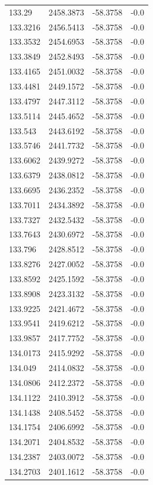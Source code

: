 \begin{table}[H]
\begin{tabular}{llll}
133.29 & 2458.3873 & -58.3758 & -0.0 \\
133.3216 & 2456.5413 & -58.3758 & -0.0 \\
133.3532 & 2454.6953 & -58.3758 & -0.0 \\
133.3849 & 2452.8493 & -58.3758 & -0.0 \\
133.4165 & 2451.0032 & -58.3758 & -0.0 \\
133.4481 & 2449.1572 & -58.3758 & -0.0 \\
133.4797 & 2447.3112 & -58.3758 & -0.0 \\
133.5114 & 2445.4652 & -58.3758 & -0.0 \\
133.543 & 2443.6192 & -58.3758 & -0.0 \\
133.5746 & 2441.7732 & -58.3758 & -0.0 \\
133.6062 & 2439.9272 & -58.3758 & -0.0 \\
133.6379 & 2438.0812 & -58.3758 & -0.0 \\
133.6695 & 2436.2352 & -58.3758 & -0.0 \\
133.7011 & 2434.3892 & -58.3758 & -0.0 \\
133.7327 & 2432.5432 & -58.3758 & -0.0 \\
133.7643 & 2430.6972 & -58.3758 & -0.0 \\
133.796 & 2428.8512 & -58.3758 & -0.0 \\
133.8276 & 2427.0052 & -58.3758 & -0.0 \\
133.8592 & 2425.1592 & -58.3758 & -0.0 \\
133.8908 & 2423.3132 & -58.3758 & -0.0 \\
133.9225 & 2421.4672 & -58.3758 & -0.0 \\
133.9541 & 2419.6212 & -58.3758 & -0.0 \\
133.9857 & 2417.7752 & -58.3758 & -0.0 \\
134.0173 & 2415.9292 & -58.3758 & -0.0 \\
134.049 & 2414.0832 & -58.3758 & -0.0 \\
134.0806 & 2412.2372 & -58.3758 & -0.0 \\
134.1122 & 2410.3912 & -58.3758 & -0.0 \\
134.1438 & 2408.5452 & -58.3758 & -0.0 \\
134.1754 & 2406.6992 & -58.3758 & -0.0 \\
134.2071 & 2404.8532 & -58.3758 & -0.0 \\
134.2387 & 2403.0072 & -58.3758 & -0.0 \\
134.2703 & 2401.1612 & -58.3758 & -0.0 \\

\end{tabular}
\end{table}
